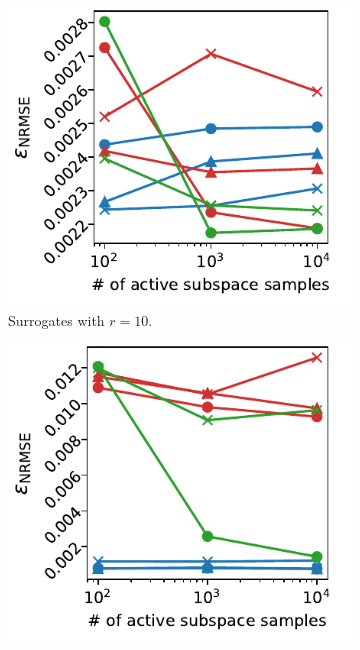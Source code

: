 \documentclass[
  a4paper,  %
  twoside,  %
  bibliography=totoc,
  headsepline,
  cleardoublepage=empty,
  parskip=half,
  draft=false
]{scrbook}
\begin{document}
\begin{mdframed}[style=style]
\begin{figure}[H]
\begin{subfigure}{.5\textwidth}
  \centering
   \includegraphics[width=\linewidth]{graphics/ww_as_10}
	\caption{Surrogates with $r=10$.}
	\label{fig:ishigami_as_3_inter}
\end{subfigure}
\begin{subfigure}{.5\textwidth}
  \centering
   \includegraphics[width=\linewidth]{graphics/ww_as_7}

\end{subfigure}
\end{figure}
\end{mdframed}
\end{document}
